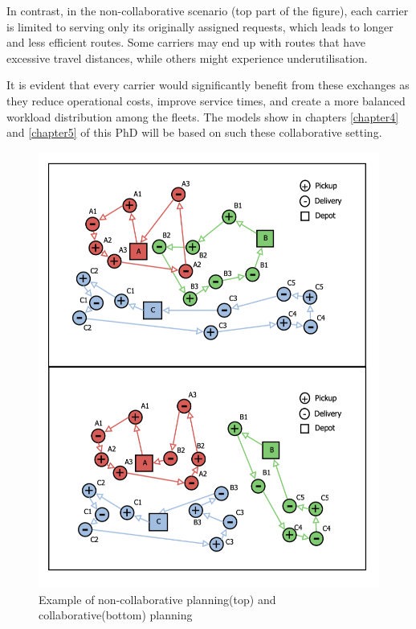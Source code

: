 In contrast, in the non-collaborative scenario (top part of the figure), each carrier is limited to serving only its originally assigned requests, which leads to longer and less efficient routes. Some carriers may end up with routes that have excessive travel distances, while others might experience underutilisation. 

It is evident that every carrier would significantly benefit from these exchanges as they reduce operational costs, improve service times, and create a more balanced workload distribution among the fleets. The models show in chapters \ref{chapter4} and \ref{chapter5} of this PhD will be based on such these collaborative setting.

\begin{figure}[htbp]
    \centering
    \includegraphics[scale=0.6]{Crest/Images/collaborative_routing.png}
    \caption{Example of non-collaborative planning(top) and collaborative(bottom) planning}
    \label{fig:collaborative}
\end{figure}


